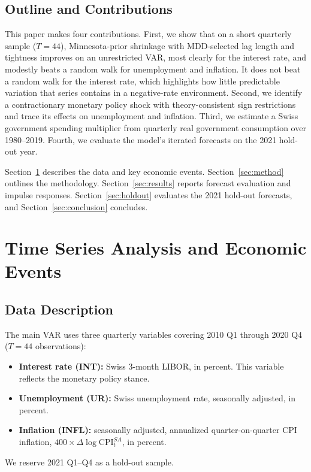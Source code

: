 \documentclass[11pt]{article}
\begin{document}
\subsection{Outline and Contributions}

This paper makes four contributions. First, we show that on a short quarterly sample ($T = 44$), Minnesota-prior shrinkage with MDD-selected lag length and tightness improves on an unrestricted VAR, most clearly for the interest rate, and modestly beats a random walk for unemployment and inflation. It does not beat a random walk for the interest rate, which highlights how little predictable variation that series contains in a negative-rate environment. Second, we identify a contractionary monetary policy shock with theory-consistent sign restrictions and trace its effects on unemployment and inflation. Third, we estimate a Swiss government spending multiplier from quarterly real government consumption over 1980--2019. Fourth, we evaluate the model's iterated forecasts on the 2021 hold-out year.

Section~\ref{sec:data} describes the data and key economic events. Section~\ref{sec:method} outlines the methodology. Section~\ref{sec:results} reports forecast evaluation and impulse responses. Section~\ref{sec:holdout} evaluates the 2021 hold-out forecasts, and Section~\ref{sec:conclusion} concludes.

\section{Time Series Analysis and Economic Events}
\label{sec:data}

\subsection{Data Description}

The main VAR uses three quarterly variables covering 2010 Q1 through 2020 Q4 ($T = 44$ observations):
\begin{itemize}
  \item \textbf{Interest rate (INT):} Swiss 3-month LIBOR, in percent. This variable reflects the monetary policy stance.
  \item \textbf{Unemployment (UR):} Swiss unemployment rate, seasonally adjusted, in percent.
  \item \textbf{Inflation (INFL):} seasonally adjusted, annualized quarter-on-quarter CPI inflation, $400 \times \Delta \log \text{CPI}^{SA}_t$, in percent.
\end{itemize}
We reserve 2021 Q1--Q4 as a hold-out sample.
\end{document}
